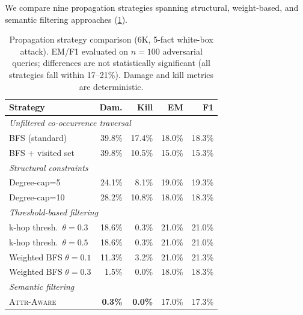 \documentclass{article}
\newcommand{\attraware}{\textsc{Attr-Aware}}
\begin{document}
We compare nine propagation strategies spanning structural, weight-based, and semantic filtering approaches (\cref{tab:defense}).

\begin{table}[htbp]
\centering
\footnotesize
\begin{tabular}{lrrrr}
\toprule
\textbf{Strategy} & \textbf{Dam.} & \textbf{Kill} & \textbf{EM} & \textbf{F1} \\
\midrule
\multicolumn{5}{l}{\textit{Unfiltered co-occurrence traversal}} \\
BFS (standard) & 39.8\% & 17.4\% & 18.0\% & 18.3\% \\
BFS + visited set & 39.8\% & 10.5\% & 15.0\% & 15.3\% \\
\midrule
\multicolumn{5}{l}{\textit{Structural constraints}} \\
Degree-cap=5 & 24.1\% & 8.1\% & 19.0\% & 19.3\% \\
Degree-cap=10 & 28.2\% & 10.8\% & 18.0\% & 18.3\% \\
\midrule
\multicolumn{5}{l}{\textit{Threshold-based filtering}} \\
k-hop thresh.\ $\theta{=}0.3$ & 18.6\% & 0.3\% & 21.0\% & 21.0\% \\
k-hop thresh.\ $\theta{=}0.5$ & 18.6\% & 0.3\% & 21.0\% & 21.0\% \\
Weighted BFS $\theta{=}0.1$ & 11.3\% & 3.2\% & 21.0\% & 21.3\% \\
Weighted BFS $\theta{=}0.3$ & 1.5\% & 0.0\% & 18.0\% & 18.3\% \\
\midrule
\multicolumn{5}{l}{\textit{Semantic filtering}} \\
\attraware{} & \textbf{0.3\%} & \textbf{0.0\%} & 17.0\% & 17.3\% \\
\bottomrule
\end{tabular}
\caption{Propagation strategy comparison (6K, 5-fact white-box attack). EM/F1 evaluated on $n{=}100$ adversarial queries; differences are not statistically significant (all strategies fall within 17--21\%). Damage and kill metrics are deterministic.}
\label{tab:defense}
\end{table}
\end{document}
